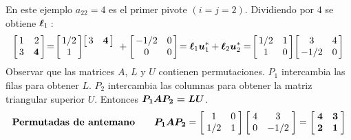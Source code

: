 \documentclass[12pt,a4paper]{article}
\newcommand{\bi}[1]{\hbox{\boldmath$#1$}}
\newcommand\1{\mbox{\,\vrule height-0.8pt depth1.0pt width2pc\,}}
\newcommand\2{\mbox{\,\vrule height-0.8pt depth1.0pt width1pc\,}}
\newcommand{\bu}{\hbox{\boldmath$u$}}
\begin{document}
\begin{enumerate}
\hspace{6pt}
En este ejemplo $a_{22}=4$ es el primer pivote $(i=j=2)$. Dividiendo por $4$ se obtiene $\bi{\ell}_1$\,:%
\vspace{-4pt}
$$
\!\left[\begin{array}{@{\,}rr@{\,}}1&2\\3&\bi{4}\\\end{array}\right]\!=\!\left[\begin{array}{@{\,}c@{\,}}1/2\\1\end{array}\right]\begin{array}{@{\!}c}\left[\begin{array}{@{\,}rr@{\,}}3&\bi{4}\\\end{array}\right]\\\\\end{array}\!+\left[\begin{array}{@{\,}cc@{\,}}-1/2&0\\0&0\\\end{array}\right]\!=\bi{\ell}_1\bu_1^*+\bi{\ell}_2\bu_2^*=\!\left[\begin{array}{@{\,}cc@{\,}}1/2&1\\1&0\\\end{array}\right]\!\left[\begin{array}{@{\,}cc@{\,}}3&4\\-1/2&0\\\end{array}\right]
$$
Observar que las matrices $A$, $L$ y $U$ contienen permutaciones. $P_1$ intercambia las filas para obtener $L$. %
$P_2$ intercambia las columnas para obtener la matriz triangular superior $U$. Entonces $\bi{P_1AP_2=LU}$. %
\vspace{-7pt} %
$$\textbf{Permutadas de antemano}\qquad \bi{P_1AP_2}=\left[\begin{array}{@{\;}cc@{\;}}1&0\\1/2&1\\\end{array}\right]\left[\begin{array}{@{\;}cc@{\;}}4&3\\0&-1/2\\\end{array}\right]=\left[\begin{array}{@{\;}cc@{\;}}\bi{4}&\bi{3}\\\bi{2}&\bi{1}\\\end{array}\right]$$

\end{enumerate}
\end{document}
